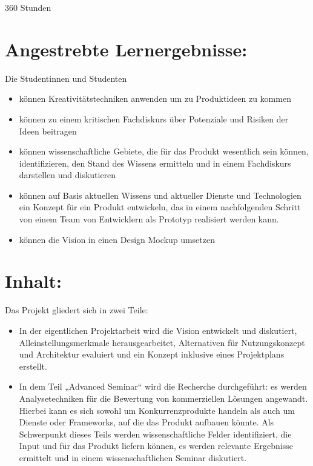 360 Stunden

\section*{Angestrebte
Lernergebnisse:}\label{angestrebte-lernergebnisse-10}

Die Studentinnen und Studenten

\begin{itemize}
\item
  können Kreativitätstechniken anwenden um zu Produktideen zu kommen
\item
  können zu einem kritischen Fachdiskurs über Potenziale und Risiken der
  Ideen beitragen
\item
  können wissenschaftliche Gebiete, die für das Produkt wesentlich sein
  können, identifizieren, den Stand des Wissens ermitteln und in einem
  Fachdiskurs darstellen und diskutieren
\item
  können auf Basis aktuellen Wissens und aktueller Dienste und
  Technologien ein Konzept für ein Produkt entwickeln, das in einem
  nachfolgenden Schritt von einem Team von Entwicklern als Prototyp
  realisiert werden kann.
\item
  können die Vision in einen Design Mockup umsetzen
\end{itemize}

\section*{Inhalt:}\label{inhalt-10}

Das Projekt gliedert sich in zwei Teile:

\begin{itemize}
\item
  In der eigentlichen Projektarbeit wird die Vision entwickelt und
  diskutiert, Alleinstellungsmerkmale herausgearbeitet, Alternativen für
  Nutzungskonzept und Architektur evaluiert und ein Konzept inklusive
  eines Projektplans erstellt.
\item
  In dem Teil „Advanced Seminar`` wird die Recherche durchgeführt: es
  werden Analysetechniken für die Bewertung von kommerziellen Lösungen
  angewandt. Hierbei kann es sich sowohl um Konkurrenzprodukte handeln
  als auch um Dienste oder Frameworks, auf die das Produkt aufbauen
  könnte. Als Schwerpunkt dieses Teils werden wissenschaftliche Felder
  identifiziert, die Input und für das Produkt liefern können, es werden
  relevante Ergebnisse ermittelt und in einem wissenschaftlichen Seminar
  diskutiert.
\end{itemize}

